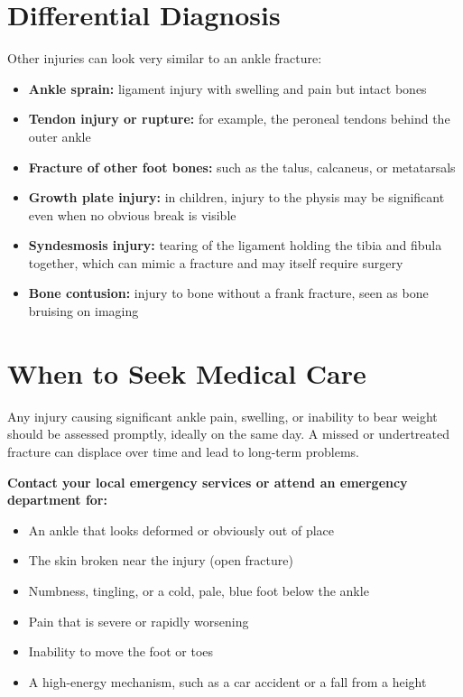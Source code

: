 \section*{Differential Diagnosis}
Other injuries can look very similar to an ankle fracture:

\begin{itemize}
    \item \textbf{Ankle sprain:} ligament injury with swelling and pain but intact bones
    \item \textbf{Tendon injury or rupture:} for example, the peroneal tendons behind the outer ankle
    \item \textbf{Fracture of other foot bones:} such as the talus, calcaneus, or metatarsals
    \item \textbf{Growth plate injury:} in children, injury to the physis may be significant even when no obvious break is visible
    \item \textbf{Syndesmosis injury:} tearing of the ligament holding the tibia and fibula together, which can mimic a fracture and may itself require surgery
    \item \textbf{Bone contusion:} injury to bone without a frank fracture, seen as bone bruising on imaging
\end{itemize}

\section*{When to Seek Medical Care}
Any injury causing significant ankle pain, swelling, or inability to bear weight should be assessed promptly, ideally on the same day. A missed or undertreated fracture can displace over time and lead to long-term problems.

\textbf{Contact your local emergency services or attend an emergency department for:}
\begin{itemize}
    \item An ankle that looks deformed or obviously out of place
    \item The skin broken near the injury (open fracture)
    \item Numbness, tingling, or a cold, pale, blue foot below the ankle
    \item Pain that is severe or rapidly worsening
    \item Inability to move the foot or toes
    \item A high-energy mechanism, such as a car accident or a fall from a height
\end{itemize}

